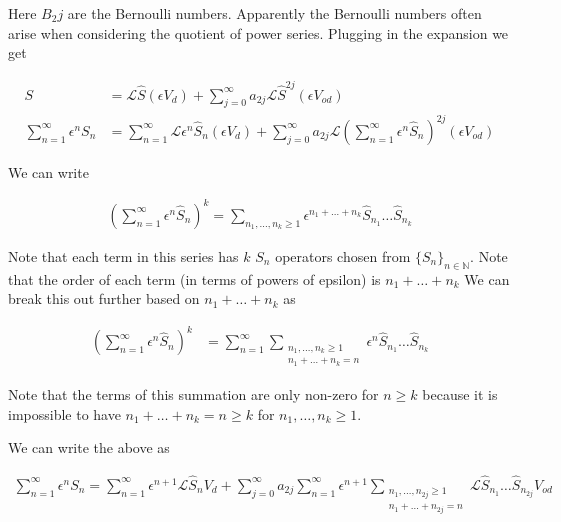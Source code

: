\documentclass[12pt]{article}
\begin{document}
Here $B_2j$ are the Bernoulli numbers. Apparently the Bernoulli numbers often arise when considering the quotient of power series. Plugging in the expansion we get

\begin{equation}
\begin{split}
S &= \mathcal{L}\hat{S} (\epsilon V_d) + \sum_{j=0}^{\infty} a_{2j} \mathcal{L} \hat{S}^{2j}(\epsilon V_{od})\\
\sum_{n=1}^{\infty} \epsilon^n S_n &= \sum_{n=1}^{\infty} \mathcal{L}\epsilon^n \hat{S}_n (\epsilon V_d) +  \sum_{j=0}^{\infty} a_{2j} \mathcal{L} \left(\sum_{n=1}^{\infty} \epsilon^n \hat{S}_n\right)^{2j} (\epsilon V_{od})
\end{split}
\end{equation}

We can write

\begin{align}
\left(\sum_{n=1}^{\infty} \epsilon^n \hat{S}_n \right)^{k} = \sum_{n_1,\ldots,n_{k}\ge 1} \epsilon^{n_1+\ldots+n_{k}} \hat{S}_{n_1} \ldots \hat{S}_{n_{k}}
\end{align}

Note that each term in this series has $k$ $S_n$ operators chosen from $\{S_n\}_{n\in \mathbb{N}}$. Note that the order of each term (in terms of powers of epsilon) is $n_1+\ldots +n_{k}$ We can break this out further based on $n_1+ \ldots + n_{k}$ as

\begin{equation}
\begin{split}
\left(\sum_{n=1}^{\infty} \epsilon^n \hat{S}_n \right)^{k} &= \sum_{n=1}^{\infty} \sum_{\substack{n_1,\ldots, n_k \ge 1\\ n_1+\ldots + n_k = n}} \epsilon^n \hat{S}_{n_1} \ldots \hat{S}_{n_k}
\end{split}
\end{equation}

Note that the terms of this summation are only non-zero for $n \ge k$ because it is impossible to have $n_1+\ldots+n_k = n \ge k$ for $n_1,\ldots,n_k\ge 1$.

We can write the above as

\begin{align}
\sum_{n=1}^{\infty} \epsilon^n S_n = \sum_{n=1}^{\infty} \epsilon^{n+1} \mathcal{L}\hat{S}_n V_d + \sum_{j=0}^{\infty} a_{2j} \sum_{n=1}^{\infty} \epsilon^{n+1} \sum_{\substack{n_1,\ldots, n_{2j} \ge 1\\n_1+\ldots+n_{2j} = n}} \mathcal{L}\hat{S}_{n_1}\ldots \hat{S}_{n_{2j}} V_{od}
\end{align}
\end{document}
